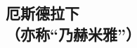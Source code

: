 \setlength\columnsep{0.8cm}
\begin{multicols}{2}

\chapter*{厄斯德拉下\\（亦称“乃赫米雅”）}

\rhead{}


\end{multicols}